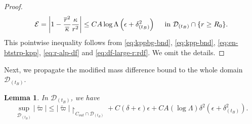 \documentclass[10pt, reqno]{amsart}
\newtheorem{lemma}[theorem]{Lemma}
\theoremstyle{definition}
\theoremstyle{remark}
\theoremstyle{conjecture}
\numberwithin{equation}{section}
\newcommand{\abs}[1]{\vert#1\vert}
\newcommand{\set}[1]{\{#1\}}
\newcommand{\0}{\emptyset}
\newcommand{\dlt}{\delta}
\newcommand{\eps}{\epsilon}
\newcommand{\kpp}{\kappa}
\newcommand{\lmb}{\lambda}
\newcommand{\Lmb}{\Lambda}
\newcommand{\calD}{\mathcal D}
\newcommand{\calE}{\mathcal E}
\newcommand{\dvr}{\lmb}
\newcommand{\rbg}{\overline{r}}					%
\newcommand{\varpibg}{\overline{\varpi}}				%
\newcommand{\kppbg}{\overline{\kpp}}					%
\newcommand{\varpidf}{\widetilde{\varpi}}				%
\newcommand{\Abs}[1]{\left\vert #1 \right\vert}
\begin{document}
\begin{proof}
\begin{equation*}
	\calE = \Abs{1 - \frac{\rbg^{2}}{\kppbg} \frac{\kpp}{r^{2}}} \leq C A \log \Lmb \left( \eps + \dlt_{(t_{B})}^{2} \right)  \quad \hbox{ in } \calD_{(t_{B})} \cap \set{r \geq R_{0}}.
\end{equation*}
This pointwise inequality follows from \eqref{eq:kppbg-bnd}, \eqref{eq:kpp-bnd}, \eqref{eq:en-btstrp-kpp}, \eqref{eq:r-alp-df} and \eqref{eq:df-large-r:rdf}. We omit the details. \qedhere
\end{proof}

Next, we propagate the modified mass difference bound to the whole domain $\calD_{(t_{B})}$.
\begin{lemma} \label{lem:btstrp-pf:m}
In $\calD_{(t_{B})}$, we have
\begin{equation} \label{eq:btstrp-pf:m}
\sup_{\calD_{(t_{B})}} \abs{\varpidf} 
\leq \abs{\varpidf}\restriction_{C_{out} \cap \calD_{(t_{B})}} + C (\dlt + \eps) \eps + C A (\log \Lmb) \dlt^{2} \left( \eps + \dlt_{(t_{B})}^{2} \right).
\end{equation}
\end{lemma}
\end{document}
